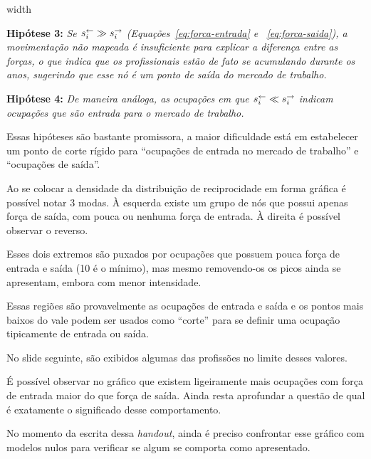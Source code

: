 \documentclass[10pt,a4paper,final]{article}
\newcommand\disappearingrule{%
  \par %
  \vskip10pt %
  \leaders\vrule width \textwidth\vskip0.4pt %
  \nointerlineskip %
  \vskip10pt %
}
\begin{document}
\disappearingrule
  
\begin{minipage}[t]{\linewidth}
  \begin{wrapfigure}{l}{0.5\textwidth}
  \end{wrapfigure}
  
  \textbf{Hipótese 3:} \textit{Se $s^\leftarrow_i \gg s^\rightarrow_i$ (Equações~\ref{eq:forca-entrada} e ~\ref{eq:forca-saida}), a movimentação não mapeada é insuficiente para explicar a diferença entre as forças, o que indica que os profissionais estão de fato se acumulando durante os anos, sugerindo que esse nó é um ponto de saída do mercado de trabalho.}
  
  \textbf{Hipótese 4:} \textit{ De maneira análoga, as ocupações em que $s^\leftarrow_i \ll s^\rightarrow_i$ indicam ocupações que são entrada para o mercado de trabalho.}
  
  Essas hipóteses são bastante promissora, a maior dificuldade está em estabelecer um ponto de corte rígido para \enquote{ocupações de entrada no mercado de trabalho} e \enquote{ocupações de saída}.
  
  Ao se colocar a densidade da distribuição de reciprocidade em forma gráfica é possível notar 3 modas. À esquerda existe um grupo de nós que possui apenas força de saída, com pouca ou nenhuma força de entrada. À direita é possível observar o reverso.
  
  Esses dois extremos são puxados por ocupações que possuem pouca força de entrada e saída (10 é o mínimo), mas mesmo removendo-os os picos ainda se apresentam, embora com menor intensidade.
  
  Essas regiões são provavelmente as ocupações de entrada e saída e os pontos mais baixos do vale podem ser usados como \enquote{corte} para se definir uma ocupação tipicamente de entrada ou saída.
  
  No slide seguinte, são exibidos algumas das profissões no limite desses valores.
  
  É possível observar no gráfico que existem ligeiramente mais ocupações com força de entrada maior do que força de saída. Ainda resta aprofundar a questão de qual é exatamente o significado desse comportamento.
  
  No momento da escrita dessa \textit{handout}, ainda é preciso confrontar esse gráfico com modelos nulos para verificar se algum se comporta como apresentado.
\end{minipage}
\end{document}
